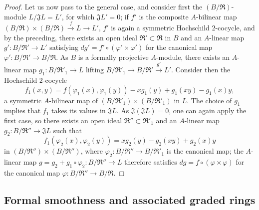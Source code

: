 \begin{proof}
Let us now pass to the general case, and consider first the $(B/\mathfrak{R})$-module $L/\mathfrak{J}L=L'$, for which $\mathfrak{J}L'=0$;
if $f'$ is the composite $A$-bilinear map $(B/\mathfrak{R})\times(B/\mathfrak{R})\xrightarrow{f}L\to L'$, $f'$ is again a symmetric Hochschild $2$-cocycle, and by the preceding, there exists an open ideal $\mathfrak{R}'\subset\mathfrak{R}$ in $B$ and an $A$-linear map $g':B/\mathfrak{R}'\to L'$ satisfying $dg'=f'\circ(\varphi'\times\varphi')$ for the canonical map $\varphi':B/\mathfrak{R}'\to B/\mathfrak{R}$.
As $B$ is a formally projective $A$-module, there exists an $A$-linear map $g_1:B/\mathfrak{R}'_1\to L$ lifting $B/\mathfrak{R}'_1\to B/\mathfrak{R}'\xrightarrow{g'}L'$.
Consider then the Hochschild $2$-cocycle
\[
  f_1(x,y) = f(\varphi_1(x),\varphi_1(y)) - xg_1(y) + g_1(xy) - g_1(x)y,
\]
a symmetric $A$-bilinear map of $(B/\mathfrak{R}'_1)\times(B/\mathfrak{R}'_1)$ in $L$.
The choice of $g_1$ implies that $f_1$ takes its values in $\mathfrak{J}L$.
As $\mathfrak{J}(\mathfrak{J}L)=0$, one can again apply the first case, so there exists an open ideal $\mathfrak{R}''\subset\mathfrak{R}'_1$ and an $A$-linear map $g_2:B/\mathfrak{R}''\to\mathfrak{J}L$ such that
\[
  f_1(\varphi_2(x),\varphi_2(y)) = xg_2(y) - g_2(xy) + g_2(x)y
\]
in $(B/\mathfrak{R}'')\times(B/\mathfrak{R}'')$, where $\varphi_2:B/\mathfrak{R}''\to B/\mathfrak{R}'_1$ is the canonical map;
the $A$-linear map $g=g_2+g_1\circ\varphi_2:B/\mathfrak{R}''\to L$ therefore satisfies $dg=f\circ(\varphi\times\varphi)$ for the canonical map $\varphi:B/\mathfrak{R}''\to B/\mathfrak{R}$.
\end{proof}

\subsection{Formal smoothness and associated graded rings}
\label{subsection:0.19.5}

